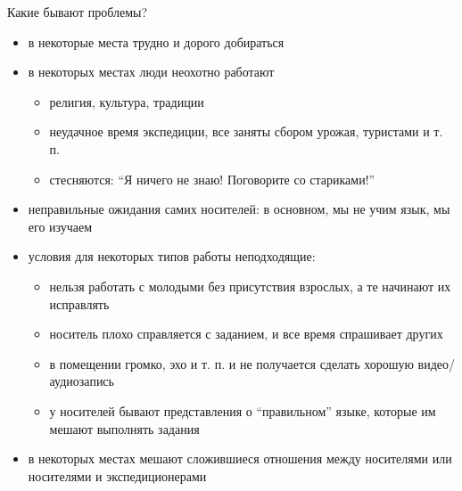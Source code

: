 \documentclass[13pt, t]{beamer}
\begin{document}

\begin{frame}{Какие бывают проблемы?}
\begin{itemize}
\item в некоторые места трудно и дорого добираться \pause
\item в некоторых местах люди неохотно работают
\begin{itemize}
\item религия, культура, традиции
\item неудачное время экспедиции, все заняты сбором урожая, туристами и т. п.
\item стесняются: ``Я ничего не знаю! Поговорите со стариками!'' \pause
\end{itemize}
\item неправильные ожидания самих носителей: в основном, мы не учим язык, мы его изучаем \pause
\item условия для некоторых типов работы неподходящие:
\begin{itemize}
\item нельзя работать с молодыми без присутствия взрослых, а те начинают их исправлять
\item носитель плохо справляется с заданием, и все время спрашивает других
\item в помещении громко, эхо и т. п. и не получается сделать хорошую видео/аудиозапись
\item у носителей бывают представления о ``правильном'' языке, которые им мешают выполнять задания \pause
\end{itemize}
\item в некоторых местах мешают сложившиеся отношения между носителями или носителями и экспедиционерами
\end{itemize}
\end{frame}

\end{document}
